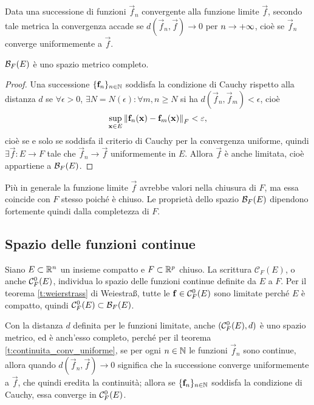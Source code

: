 Data una successione di funzioni $\vec f_n$ convergente alla funzione limite $\vec f$, secondo tale metrica la convergenza accade se $d(\vec f_n,\vec f)\to 0$ per $n\to+\infty$, cioè se $\vec f_n$ converge uniformemente a $\vec f$.
\begin{teorema}
$\mathcal{B}_{F}({E})$ è uno spazio metrico completo.
\end{teorema}
\begin{proof}
Una successione $\{\mathbf{f}_n\}_{n\in\mathbb{N}}$ soddisfa la condizione di Cauchy rispetto alla distanza $d$ se $\forall\epsilon>0$, $\exists N=N(\epsilon)\colon\forall m,n\geq N$ si ha $d(\vec f_n,\vec f_m)<\epsilon$, cioè
\[
\sup_{\mathbf{x}\in E}\left\|{\mathbf{f}_n(\mathbf{x})-\mathbf{f}_m(\mathbf{x})}\right\|_F<\varepsilon,
\]
cioè se e solo se soddisfa il criterio di Cauchy per la convergenza uniforme, quindi $\exists\vec f\colon E\to F$ tale che $\vec f_n\to \vec f$ uniformemente in $E$. Allora $\vec f$ è anche limitata, cioè appartiene a $\mathcal{B}_{F}({E})$.
\end{proof}
Più in generale la funzione limite $\vec f$ avrebbe valori nella chiusura di $F$, ma essa coincide con $F$ stesso poiché è chiuso. Le proprietà dello spazio $\mathcal{B}_{F}({E})$ dipendono fortemente quindi dalla completezza di $F$.

\subsection*{Spazio delle funzioni continue}
Siano $E\subset\mathbb{R}^n$ un insieme compatto e $F\subset\mathbb{R}^p$ chiuso. La scrittura $\mathcal{C}_F(E)$, o anche $\mathcal{C}^{{0}}_F(E)$, individua lo spazio delle funzioni continue definite da $E$ a $F$.
Per il teorema \ref{t:weierstrass} di Weiestra\ss, tutte le $\mathbf{f}\in\mathcal{C}^{{0}}_F(E)$ sono limitate perché $E$ è compatto, quindi $\mathcal{C}^{{0}}_F(E)\subset\mathcal B_F(E)$.

Con la distanza $d$ definita per le funzioni limitate, anche $(\mathcal{C}^{{0}}_F(E),d)$ è uno spazio metrico, ed è anch'esso completo, perché per il teorema \ref{t:continuita_conv_uniforme}, se per ogni $n\in\mathbb{N}$ le funzioni $\vec f_n$ sono continue, allora quando $d(\vec f_n,\vec f)\to 0$ significa che la successione converge uniformemente a $\vec f$, che quindi eredita la continuità; allora se $\{\mathbf{f}_n\}_{n\in\mathbb{N}}$ soddisfa la condizione di Cauchy, essa converge in $\mathcal{C}^{{0}}_F(E)$.

